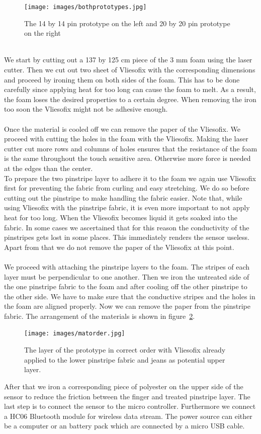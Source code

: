 \begin{figure}
\texttt{[image: images/bothprototypes.jpg]}
\caption{The 14 by 14 pin prototype on the left and 20 by 20 pin prototype on the right}
\label{fig:bothprototypes}
\end{figure}
\\
We start by cutting out a 137 by 125 cm piece of the 3 mm foam using the laser cutter. Then we cut out two sheet of Vliesofix with the corresponding dimensions and proceed by ironing them on both sides of the foam. This has to be done carefully since applying heat for too long can cause the foam to melt. As a result, the foam loses the desired properties to a certain degree. When removing the iron too soon the Vliesofix might not be adhesive enough. 
\\ \\
Once the material is cooled off we can remove the paper of the Vliesofix. We proceed with cutting the holes in the foam with the Vliesofix. Making the laser cutter cut more rows and columns of holes ensures that the resistance of the foam is the same throughout the touch sensitive area. Otherwise more force is needed at the edges than the center. 
\\
To prepare the two pinstripe layer to adhere it to the foam we again use Vliesofix first for preventing the fabric from curling and easy stretching. We do so before cutting out the pinstripe to make handling the fabric easier. Note that, while using Vliesofix with the pinstripe fabric, it is even more important to not apply heat for too long. When the Vliesofix becomes liquid it gets soaked into the fabric. In some cases we ascertained that for this reason the conductivity of the pinstripes gets lost in some places. This immediately renders the sensor useless. Apart from that we do not remove the paper of the Vliesofix at this point.
\\ \\
We proceed with attaching the pinstripe layers to the foam. The stripes of each layer must be perpendicular to one another. Then we iron the untreated side of the  one pinstripe fabric to the foam and after cooling off the other pinstripe to the other side.  We have to make sure that the conductive stripes and the holes in the foam are aligned properly. Now we can remove the paper from the pinstripe fabric. The arrangement of the materials is shown in figure~\ref{fig:matorder}.\\
\begin{figure}
\texttt{[image: images/matorder.jpg]}
\caption{The layer of the prototype in correct order with Vliesofix already applied to the lower pinstripe fabric and jeans as potential upper layer.}
\label{fig:matorder}
\end{figure}
After that we iron a corresponding piece of polyester on the upper side of the sensor to reduce the friction between the finger and treated pinstripe layer. The last step is to connect the sensor to the micro controller. Furthermore we connect a HC06  Bluetooth module for wireless data stream. The power source can either be a computer or an battery pack which are connected by a micro USB cable.
 
